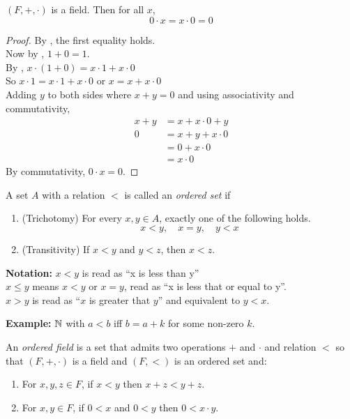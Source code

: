 \documentclass[12pt]{article}
\begin{document}
\begin{thm} \label{thm:0x=0}
    $(F, +, \cdot)$ is a field. Then for all $x$, \[
        0 \cdot x = x \cdot 0 = 0
    \]
\end{thm}
\begin{proof}
    By , the first equality holds. \\
    Now by , $1 + 0 = 1$. \\
    By , $x \cdot (1 + 0) = x \cdot 1 + x \cdot 0$ \\
    So $x \cdot 1 = x \cdot 1 + x \cdot 0$ or $x = x + x \cdot 0$ \\
    Adding $y$ to both sides where $x + y = 0$  and using associativity and commutativity,
    \begin{align*}
        x + y &= x + x \cdot 0 + y \\ 
        0 &= x + y + x \cdot 0 \\
        &= 0 + x \cdot 0 \\
        &= x \cdot 0
    \end{align*}
    By commutativity, $0 \cdot x = 0$.
\end{proof}

\begin{defn} \label{defn:ordered set}
    A set $A$ with a relation $<$ is called an \emph{ordered set} if
    \begin{enumerate}[label=(O\arabic*)]
        \item \label{order:trichotomy}
            (Trichotomy) For every $x, y \in A$, exactly one of the following holds. \[
                x < y, \quad x = y, \quad y < x
            \]
        \item \label{order:transitivity}
            (Transitivity) If $x < y$ and $y < z$, then $x < z$.
        \setcounter{temp}{\value{enumi}}
    \end{enumerate}
    \textbf{Notation:} $x < y$ is read as ``x is less than y'' \\
    $x \leq y$ means $x < y$ or $x = y$, read as ``x is less that or equal to y''. \\
    $x > y$ is read as ``$x$ is greater that $y$'' and equivalent to $y < x$.
\end{defn}
\textbf{Example:} $\mathbb{N}$ with $a < b$ iff $b = a + k$ for some non-zero $k$.

\begin{defn} \label{defn:ordered field}
    An \emph{ordered field} is a set that admits two operations $+$ and $\cdot$ and relation $<$ so that $(F, +, \cdot)$ is a field and $(F, <)$ is an ordered set and:
    \begin{enumerate}[label=(O\arabic*)]
        \setcounter{enumi}{\value{temp}}
        \item \label{order:addn preserves}
            For $x, y, z \in F$, if $x < y$ then $x + z < y + z$.
        \item \label{order:mult preserves}
            For $x, y \in F$, if $0 < x$ and $0 < y$ then $0 < x \cdot y$.
    \end{enumerate}
\end{defn}
\end{document}
